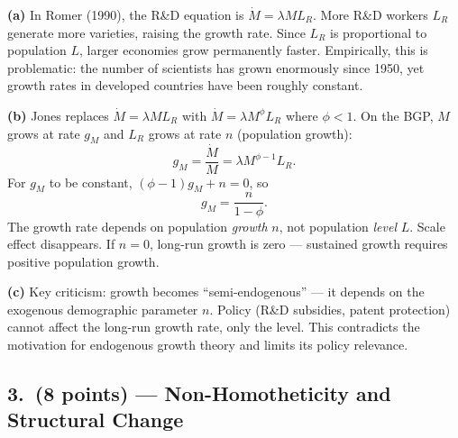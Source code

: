 \documentclass[a4paper,11pt]{article}
\begin{document}
\begin{answerbox}
\textbf{(a)} In Romer (1990), the R\&D equation is $\dot{M} = \lambda M L_R$.  More
R\&D workers $L_R$ generate more varieties, raising the growth rate.  Since $L_R$ is
proportional to population $L$, larger economies grow permanently faster.  Empirically,
this is problematic: the number of scientists has grown enormously since 1950, yet
growth rates in developed countries have been roughly constant.

\textbf{(b)} Jones replaces $\dot{M} = \lambda M L_R$ with
$\dot{M} = \lambda M^{\phi} L_R$ where $\phi < 1$.  On the BGP, $M$ grows at rate
$g_M$ and $L_R$ grows at rate $n$ (population growth):
\[
    g_M = \frac{\dot{M}}{M} = \lambda M^{\phi-1}L_R.
\]
For $g_M$ to be constant, $(\phi-1)g_M + n = 0$, so
\[
    \boxed{g_M = \frac{n}{1-\phi}.}
\]
The growth rate depends on population \emph{growth} $n$, not population \emph{level} $L$.
Scale effect disappears.  If $n = 0$, long-run growth is zero --- sustained growth requires
positive population growth.

\textbf{(c)} Key criticism: growth becomes ``semi-endogenous'' --- it depends on the
exogenous demographic parameter $n$.  Policy (R\&D subsidies, patent protection) cannot
affect the long-run growth rate, only the level.  This contradicts the motivation for
endogenous growth theory and limits its policy relevance.
\end{answerbox}

\subsection*{3.\ (8 points) --- Non-Homotheticity and Structural Change}
\end{document}
